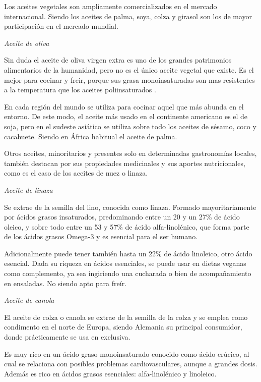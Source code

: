 \documentclass[a4paper,12pt]{article}
\begin{document}
\begin{multicols}{2}

Los aceites vegetales son ampliamente comercializados
en el mercado internacional. Siendo los aceites de palma,
soya, colza y girasol son los de mayor participación
en el mercado mundial.

\textit{Aceite de oliva}

Sin duda el aceite de oliva virgen extra es uno de los grandes patrimonios alimentarios de la humanidad, pero no es el único aceite vegetal que existe. Es el mejor para cocinar y freir, porque sus grasa monoinsaturadas son mas resistentes a la temperatura que los aceites poliinsaturados \cite{Berdeaux2012, Leon2018}.

En cada región del mundo se utiliza para cocinar aquel que más abunda en el entorno. De este modo, el aceite más usado en el continente americano es el de soja, pero en el sudeste asiático se utiliza sobre todo los aceites de sésamo, coco y cacahuete. Siendo en  África habitual el aceite de palma.

Otros aceites, minoritarios y presentes solo en determinadas gastronomías locales, también destacan por sus propiedades medicinales y sus aportes nutricionales, como es el caso de los aceites de nuez o linaza. 


\textit{Aceite de linaza}

Se extrae de la semilla del lino, conocida como linaza. Formado mayoritariamente por ácidos grasos insaturados, predominando entre un 20 y un 27\% de ácido oleico, y sobre todo entre un 53 y 57\% de ácido alfa-linolénico, que forma parte de los ácidos grasos Omega-3 y es esencial para el ser humano.

Adicionalmente puede tener también hasta un 22\% de ácido linoleico, otro ácido esencial. Dada su riqueza en ácidos esenciales, se puede usar en dietas veganas como complemento, ya sea ingiriendo una cucharada o bien de acompañamiento en ensaladas. No siendo apto para freír.

\textit{Aceite de canola}

El aceite de colza o canola se extrae de la semilla de la colza y se emplea como condimento en el norte de Europa, siendo Alemania su principal consumidor, donde prácticamente se usa en exclusiva. 

Es muy rico en un ácido graso monoinsaturado conocido como ácido erúcico, al cual se relaciona con posibles problemas cardiovasculares, aunque a grandes dosis. Además es rico en ácidos grasos esenciales: alfa-linolénico y linoleico.


\end{multicols}
\end{document}
